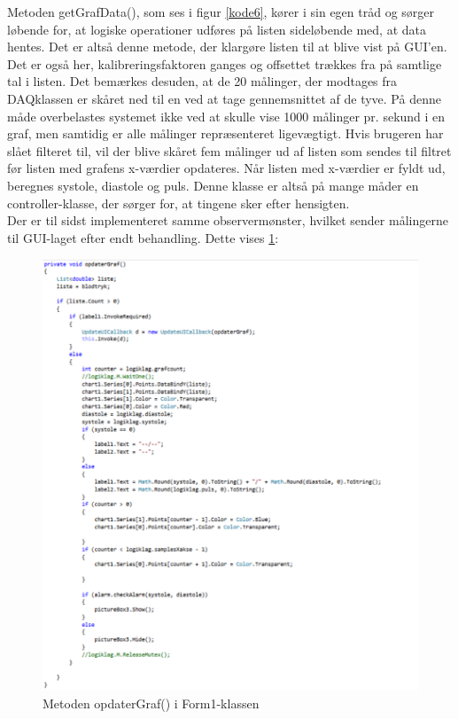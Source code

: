 Metoden getGrafData(), som ses i figur \ref{kode6}, kører i sin egen tråd og sørger løbende for, at logiske operationer udføres på listen sideløbende med, at data hentes. Det er altså denne metode, der klargøre listen til at blive vist på GUI’en. Det er også her, kalibreringsfaktoren ganges og offsettet trækkes fra på samtlige tal i listen. Det bemærkes desuden, at de 20 målinger, der modtages fra DAQklassen er skåret ned til en ved at tage gennemsnittet af de tyve. På denne måde overbelastes systemet ikke ved at skulle vise 1000 målinger pr. sekund i en graf, men samtidig er alle målinger repræsenteret ligevægtigt.
Hvis brugeren har slået filteret til, vil der blive skåret fem målinger ud af listen som sendes til filtret før listen med grafens x-værdier opdateres. Når listen med x-værdier er fyldt ud, beregnes systole, diastole og puls. Denne klasse er altså på mange måder en controller-klasse, der sørger for, at tingene sker efter hensigten.\\
Der er til sidst implementeret samme observermønster, hvilket sender målingerne til GUI-laget efter endt behandling. Dette vises \ref{kode7}:

\begin{figure}[H]
	\includegraphics[width=1.4\textwidth]{Figurer/Jeppe/7}
	\caption{Metoden opdaterGraf() i Form1-klassen}
	\label{kode7}
\end{figure}

